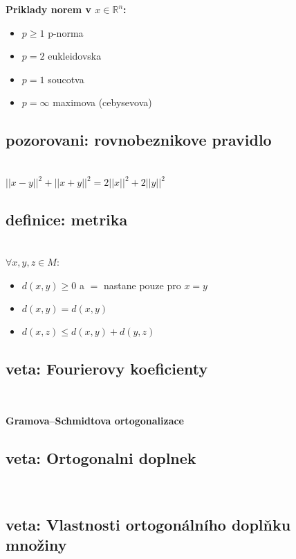 \documentclass[a4paper]{article}
\newcommand{\definice}[3]{
	\setcounter{section}{#1}
	\setcounter{subsection}{#2}
	\addtocounter{subsection}{-1}
	\subsection{definice: #3}~
}
\newcommand{\veta}[3]{
	\setcounter{section}{#1}
	\setcounter{subsection}{#2}
	\addtocounter{subsection}{-1}
	\subsection{veta: #3}~
}
\newcommand{\tvrzeni}[3]{
	\setcounter{section}{#1}
	\setcounter{subsection}{#2}
	\addtocounter{subsection}{-1}
	\subsection{veta: #3}~
}
\newcommand{\pozorovani}[3]{
	\setcounter{section}{#1}
	\setcounter{subsection}{#2}
	\addtocounter{subsection}{-1}
	\subsection{pozorovani: #3}~
}
\begin{document}

\textbf{Priklady norem v $x\in \mathbb{R}^n$:}
\begin{itemize}
	\item $p\geq 1$ p-norma
	\item $p=2$ eukleidovska
	\item $p=1$ soucotva
	\item $p=\infty$ maximova (cebysevova)
\end{itemize}

\pozorovani{8}{20}{rovnobeznikove pravidlo}\\
$||x-y||^2 + ||x+y||^2 = 2||x||^2 + 2||y||^2$

\definice{8}{21}{metrika}\\
$\forall x,y,z \in M$:\\
\begin{itemize}
	\item $d(x,y) \geq 0$ a $=$ nastane pouze pro $x=y$
	\item $d(x,y) = d(x,y)$
	\item $d(x,z) \leq d(x,y) + d(y,z)$
\end{itemize}

\veta{8}{27}{Fourierovy koeficienty}
\textbf{Gramova–Schmidtova ortogonalizace}\\
\veta{8}{38}{Ortogonalni doplnek}


\tvrzeni{8}{29}{Vlastnosti ortogonálního doplňku množiny}
\end{document}
